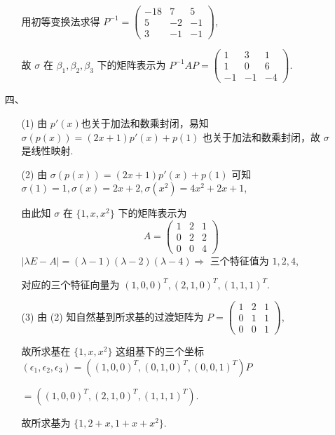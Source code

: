 \begin{enumerate}
\begin{enumerate}
\[        \]
        用初等变换法求得 \(P^{-1}=\begin{pmatrix}
            -18 & 7 & 5\\
            5 & -2 & -1\\
            3 & -1 & -1
        \end{pmatrix}\),\par
        故 \(\sigma\) 在 \(\beta_1,\beta_2,\beta_3\) 下的矩阵表示为 \(P^{-1}AP=\begin{pmatrix}
            1 & 3 & 1\\
            1 & 0 & 6\\
            -1 & -1 & -4
        \end{pmatrix}\).
    \end{enumerate}
    \item[四、]
    \begin{enumerate}
        \item[(1)] 由 \(p'(x)\)也关于加法和数乘封闭，易知 \(\sigma(p(x))=(2x+1)p'(x)+p(1)\) 也关于加法和数乘封闭，故 \(\sigma\) 是线性映射.
        \item[(2)] 由 \(\sigma(p(x))=(2x+1)p'(x)+p(1)\) 可知 \(\sigma(1)=1,\sigma(x)=2x+2,\sigma(x^2)=4x^2+2x+1\),\par
        由此知 \(\sigma\) 在 \(\{1,x,x^2\}\) 下的矩阵表示为
        \[
        A=\begin{pmatrix}
            1 & 2 & 1\\
            0 & 2 & 2\\
            0 & 0 & 4
        \end{pmatrix}
        \]
        \(|\lambda E-A|=(\lambda-1)(\lambda-2)(\lambda-4) \Rightarrow\) 三个特征值为 \(1,2,4\),\par
        对应的三个特征向量为 \((1,0,0)^{T},(2,1,0)^{T},(1,1,1)^{T}\).
        \item[(3)] 由 (2) 知自然基到所求基的过渡矩阵为
        \(P=\begin{pmatrix}
            1 & 2 & 1\\
            0 & 1 & 1\\
            0 & 0 & 1
        \end{pmatrix}\),\par
        故所求基在 \(\{1,x,x^2\}\) 这组基下的三个坐标 \(\left(\epsilon_1,\epsilon_2,\epsilon_3\right)=\left((1,0,0)^{T},(0,1,0)^{T},(0,0,1)^{T}\right)P\)\par
        \(=\left((1,0,0)^{T},(2,1,0)^{T},(1,1,1)^{T}\right)\).\par
        故所求基为 \(\{1,2+x,1+x+x^2\}\).

\end{enumerate}
\end{enumerate}
